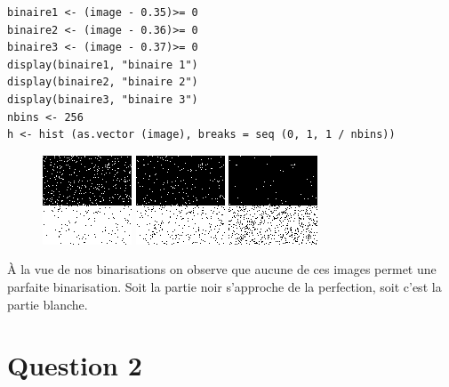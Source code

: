 \documentclass[a4paper,12pt]{report}
\begin{document}
\begin{lstlisting}
binaire1 <- (image - 0.35)>= 0
binaire2 <- (image - 0.36)>= 0
binaire3 <- (image - 0.37)>= 0
display(binaire1, "binaire 1")
display(binaire2, "binaire 2")
display(binaire3, "binaire 3")
nbins <- 256
h <- hist (as.vector (image), breaks = seq (0, 1, 1 / nbins))
\end{lstlisting}

\begin{figure}[!ht]
	\center
	\includegraphics[scale=1]{image/binaire1.png}
	\includegraphics[scale=1]{image/binaire2.png}
	\includegraphics[scale=1]{image/binaire3.png}
\end{figure}

À la vue de nos binarisations on observe que aucune de ces images permet une parfaite binarisation. Soit la partie noir s'approche de la perfection, soit c'est la partie blanche.

\newpage

\section*{Question 2}
\end{document}
